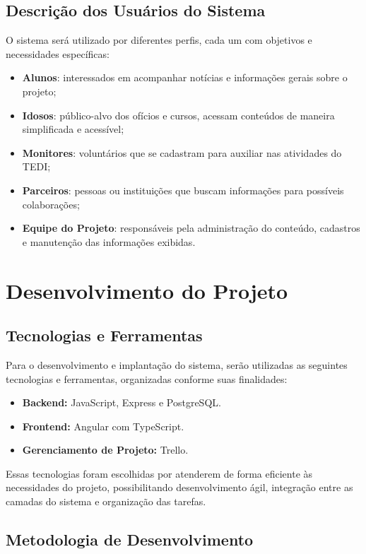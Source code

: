 \documentclass[a4paper,12pt]{article}
\begin{document}
\subsection{Descrição dos Usuários do Sistema}
O sistema será utilizado por diferentes perfis, cada um com objetivos e necessidades específicas:
\begin{itemize}
    \item \textbf{Alunos}: interessados em acompanhar notícias e informações gerais sobre o projeto;
    \item \textbf{Idosos}: público-alvo dos ofícios e cursos, acessam conteúdos de maneira simplificada e acessível;
    \item \textbf{Monitores}: voluntários que se cadastram para auxiliar nas atividades do TEDI;
    \item \textbf{Parceiros}: pessoas ou instituições que buscam informações para possíveis colaborações;
    \item \textbf{Equipe do Projeto}: responsáveis pela administração do conteúdo, cadastros e manutenção das informações exibidas.
\end{itemize}

\newpage
\section{Desenvolvimento do Projeto}

\subsection{Tecnologias e Ferramentas}

Para o desenvolvimento e implantação do sistema, serão utilizadas as seguintes tecnologias e ferramentas, organizadas conforme suas finalidades:

\begin{itemize}
    \item \textbf{Backend:} JavaScript, Express e PostgreSQL.
    \item \textbf{Frontend:} Angular com TypeScript.
    \item \textbf{Gerenciamento de Projeto:} Trello.
\end{itemize}

Essas tecnologias foram escolhidas por atenderem de forma eficiente às necessidades do projeto, possibilitando desenvolvimento ágil, integração entre as camadas do sistema e organização das tarefas.

\subsection{Metodologia de Desenvolvimento}
\end{document}
